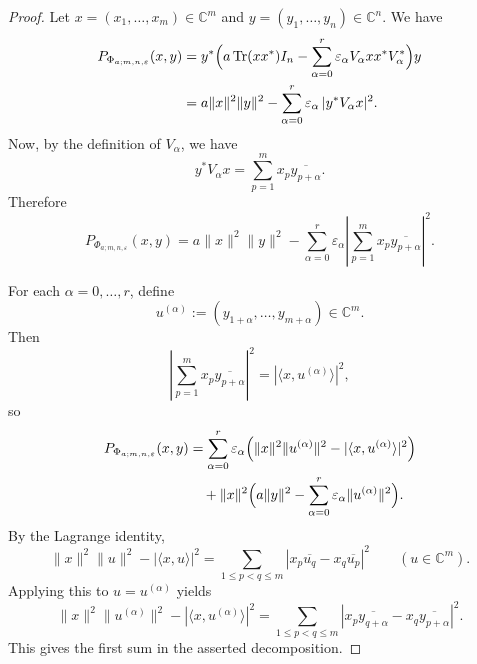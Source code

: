 \documentclass[12pt,a4paper]{amsart}
\theoremstyle{plain}
\theoremstyle{remark}
\theoremstyle{definition}
\newcommand{\Tr}{{\textrm{Tr}}}
\begin{document}
\begin{proof}
	Let $x=(x_1,\dots,x_m)\in\mathbb C^m$ and $y=(y_1,\dots,y_n)\in\mathbb C^n$. We have
	\[
	\begin{aligned}
		P_{\Phi_{a;m,n,\varepsilon}}(x,y)
		&=
		y^*\Bigl(a\,\Tr(xx^*)I_n-\sum_{\alpha=0}^{r}\varepsilon_\alpha V_\alpha xx^*V_\alpha^*\Bigr)y\\
		&=
		a\|x\|^2\|y\|^2-\sum_{\alpha=0}^{r}\varepsilon_\alpha\, |y^*V_\alpha x|^2.
	\end{aligned}
	\]
	Now, by the definition of $V_\alpha$,
	we have
	\[
	y^*V_\alpha x=\sum_{p=1}^m x_p\overline{y_{p+\alpha}}.
	\]
	Therefore
	\[
	P_{\Phi_{a;m,n,\varepsilon}}(x,y)
	=
	a\|x\|^2\|y\|^2
	-
	\sum_{\alpha=0}^{r}\varepsilon_\alpha
	\left|\sum_{p=1}^m x_p\overline{y_{p+\alpha}}\right|^2.
	\]
	
	For each $\alpha=0,\dots,r$, define
	\[
	u^{(\alpha)}:=(y_{1+\alpha},\dots,y_{m+\alpha})\in\mathbb C^m.
	\]
	Then
	\[
	\left|\sum_{p=1}^m x_p\overline{y_{p+\alpha}}\right|^2
	=
	|\langle x,u^{(\alpha)}\rangle|^2,
	\]
	so
	\[
	\begin{aligned}
		P_{\Phi_{a;m,n,\varepsilon}}(x,y)
		&=
		\sum_{\alpha=0}^{r}\varepsilon_\alpha
		\Bigl(\|x\|^2\|u^{(\alpha)}\|^2-|\langle x,u^{(\alpha)}\rangle|^2\Bigr)\\
		&\quad+
		\|x\|^2\Bigl(a\|y\|^2-\sum_{\alpha=0}^{r}\varepsilon_\alpha\|u^{(\alpha)}\|^2\Bigr).
	\end{aligned}
	\]
	By the Lagrange identity,
	\[
	\|x\|^2\|u\|^2-|\langle x,u\rangle|^2
	=
	\sum_{1\le p<q\le m}|x_p\overline{u_q}-x_q\overline{u_p}|^2
	\qquad (u\in\mathbb C^m).
	\]
	Applying this to $u=u^{(\alpha)}$ yields
	\[
	\|x\|^2\|u^{(\alpha)}\|^2-|\langle x,u^{(\alpha)}\rangle|^2
	=
	\sum_{1\le p<q\le m}
	\left|x_p\overline{y_{q+\alpha}}-x_q\overline{y_{p+\alpha}}\right|^2.
	\]
	This gives the first sum in the asserted decomposition.
	

\end{proof}
\end{document}
